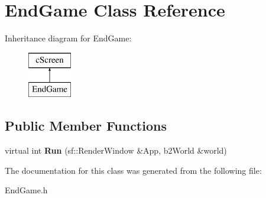\hypertarget{class_end_game}{}\section{End\+Game Class Reference}
\label{class_end_game}
Inheritance diagram for End\+Game\+:\begin{figure}[H]
\begin{center}
\leavevmode
\includegraphics[height=2.000000cm]{class_end_game}
\end{center}
\end{figure}
\subsection*{Public Member Functions}
\begin{DoxyCompactItemize}
\item 
virtual int {\bfseries Run} (sf\+::\+Render\+Window \&App, b2\+World \&world)\hypertarget{class_end_game_a847a31948bfed50c6e78e0ac09f564dd}{}\label{class_end_game_a847a31948bfed50c6e78e0ac09f564dd}

\end{DoxyCompactItemize}


The documentation for this class was generated from the following file\+:\begin{DoxyCompactItemize}
\item 
End\+Game.\+h\end{DoxyCompactItemize}
